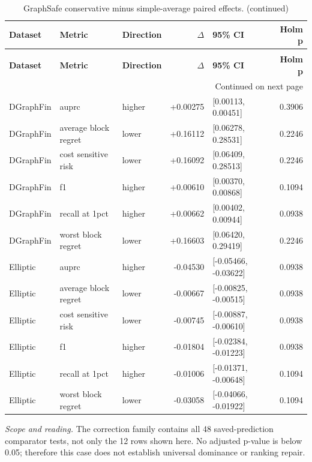 \begingroup
\footnotesize
\setlength{\tabcolsep}{3pt}
\renewcommand{\arraystretch}{1.10}
\begin{longtable}{@{}p{} p{} p{} r p{} r@{}}
\caption{GraphSafe conservative minus simple-average paired effects.}\label{tab:s-graphsafe-paired}\\
\toprule
\textbf{Dataset} & \textbf{Metric} & \textbf{Direction} & \textbf{$\Delta$} & \textbf{95\% CI} & \textbf{Holm p} \\
\midrule
\endfirsthead
\caption[]{GraphSafe conservative minus simple-average paired effects. (continued)}\\
\toprule
\textbf{Dataset} & \textbf{Metric} & \textbf{Direction} & \textbf{$\Delta$} & \textbf{95\% CI} & \textbf{Holm p} \\
\midrule
\endhead
\midrule
\multicolumn{6}{r}{\footnotesize Continued on next page}\\
\endfoot
\bottomrule
\endlastfoot
DGraphFin & auprc & higher & +0.00275 & [0.00113, 0.00451] & 0.3906 \\
DGraphFin & average block regret & lower & +0.16112 & [0.06278, 0.28531] & 0.2246 \\
DGraphFin & cost sensitive risk & lower & +0.16092 & [0.06409, 0.28513] & 0.2246 \\
DGraphFin & f1 & higher & +0.00610 & [0.00370, 0.00868] & 0.1094 \\
DGraphFin & recall at 1pct & higher & +0.00662 & [0.00402, 0.00944] & 0.0938 \\
DGraphFin & worst block regret & lower & +0.16603 & [0.06420, 0.29419] & 0.2246 \\
Elliptic & auprc & higher & -0.04530 & [-0.05466, -0.03622] & 0.0938 \\
Elliptic & average block regret & lower & -0.00667 & [-0.00825, -0.00515] & 0.0938 \\
Elliptic & cost sensitive risk & lower & -0.00745 & [-0.00887, -0.00610] & 0.0938 \\
Elliptic & f1 & higher & -0.01804 & [-0.02384, -0.01223] & 0.0938 \\
Elliptic & recall at 1pct & higher & -0.01006 & [-0.01371, -0.00648] & 0.1094 \\
Elliptic & worst block regret & lower & -0.03058 & [-0.04066, -0.01922] & 0.1094 \\
\end{longtable}
\noindent\footnotesize\emph{Scope and reading.} The correction family contains all 48 saved-prediction comparator tests, not only the 12 rows shown here. No adjusted p-value is below 0.05; therefore this case does not establish universal dominance or ranking repair.\par
\endgroup
